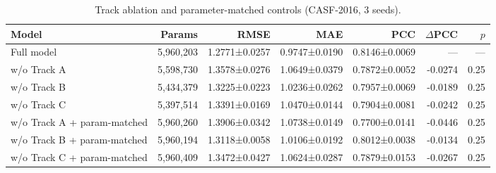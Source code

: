 \begin{table}[t]
\centering
\caption{Track ablation and parameter-matched controls (CASF-2016, 3 seeds).}
\label{tab:SX_ablation}
\begin{tabular}{lrrrrrr}
\toprule
Model & Params & RMSE & MAE & PCC & $\Delta$PCC & $p$ \\
\midrule
Full model & 5,960,203 & 1.2771±0.0257 & 0.9747±0.0190 & 0.8146±0.0069 & — & — \\
w/o Track A & 5,598,730 & 1.3578±0.0276 & 1.0649±0.0379 & 0.7872±0.0052 & -0.0274 & 0.25 \\
w/o Track B & 5,434,379 & 1.3225±0.0223 & 1.0236±0.0262 & 0.7957±0.0069 & -0.0189 & 0.25 \\
w/o Track C & 5,397,514 & 1.3391±0.0169 & 1.0470±0.0144 & 0.7904±0.0081 & -0.0242 & 0.25 \\
w/o Track A + param-matched & 5,960,260 & 1.3906±0.0342 & 1.0738±0.0149 & 0.7700±0.0141 & -0.0446 & 0.25 \\
w/o Track B + param-matched & 5,960,194 & 1.3118±0.0058 & 1.0106±0.0192 & 0.8012±0.0038 & -0.0134 & 0.25 \\
w/o Track C + param-matched & 5,960,409 & 1.3472±0.0427 & 1.0624±0.0287 & 0.7879±0.0153 & -0.0267 & 0.25 \\
\bottomrule
\end{tabular}
\end{table}
